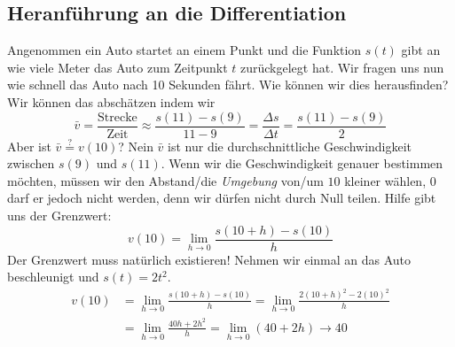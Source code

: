 \subsection{Heranführung an die Differentiation}
Angenommen ein Auto startet an einem Punkt und die Funktion $s(t)$ gibt an wie viele Meter das Auto zum Zeitpunkt $t$ zurückgelegt hat. Wir fragen uns nun wie schnell das Auto nach 10 Sekunden fährt. Wie können wir dies herausfinden? Wir können das abschätzen indem wir 
\begin{equation*}
\bar{v} = \frac{\text{Strecke}}{\text{Zeit}} \approx \frac{s(11) - s(9)}{11 - 9} = \frac{\Delta s}{\Delta t} = \frac{s(11) - s(9)}{2}
\end{equation*}
Aber ist $\bar{v} \stackrel{?}{=} v(10)$? Nein $\bar{v}$ ist nur die durchschnittliche Geschwindigkeit zwischen $s(9)$ und $s(11)$. Wenn wir die Geschwindigkeit genauer bestimmen möchten, müssen wir den Abstand/die \textit{Umgebung} von/um $10$ kleiner wählen, $0$ darf er jedoch nicht werden, denn wir dürfen nicht durch Null teilen. Hilfe gibt uns der Grenzwert:
\begin{equation*}
v(10) = \lim\limits_{h \to 0} \frac{s(10+h) - s(10)}{h}
\end{equation*}
Der Grenzwert muss natürlich existieren! Nehmen wir einmal an das Auto beschleunigt und $s(t) = 2 t^2$.
\begin{align*}
v(10) &= \lim\limits_{h \to 0} \frac{s(10+h) - s(10)}{h} = \lim\limits_{h \to 0} \frac{2 (10+h)^2 - 2 (10)^2}{h}\\
&= \lim\limits_{h \to 0} \frac{40h + 2h^2}{h} = \lim\limits_{h \to 0}(40 + 2h) \to 40
\end{align*}

